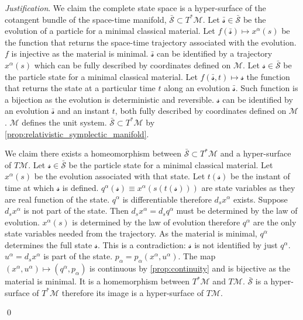 \documentclass[aps,pra,10pt,twocolumn,floatfix,nofootinbib]{revtex4-1}
\numberwithin{equation}{section}
\theoremstyle{definition}
\newenvironment{justification}{\emph{Justification}.}{\qed}
\begin{document}
\begin{justification}
	We claim the complete state space is a hyper-surface of the cotangent bundle of the space-time manifold, $\bar{\mathcal{S}} \subset T^*\mathcal{M}$. Let $\bar{\mathcal{s}} \in \bar{\mathcal{S}}$ be the evolution of a particle for a minimal classical material. Let $f(\bar{\mathcal{s}}) \mapsto x^\alpha(s)$ be the function that returns the space-time trajectory associated with the evolution. $f$ is injective as the material is minimal. $\bar{\mathcal{s}}$ can be identified by a trajectory $x^\alpha(s)$ which can be fully described by coordinates defined on $\mathcal{M}$. Let $\mathcal{s} \in \bar{\mathcal{S}}$ be the particle state for a minimal classical material. Let $f(\bar{\mathcal{s}}, t) \mapsto \mathcal{s}$ the function that returns the state at a particular time $t$ along an evolution $\bar{\mathcal{s}}$. Such function is a bijection as the evolution is deterministic and reversible. $\mathcal{s}$ can be identified by an evolution $\bar{\mathcal{s}}$ and an instant $t$, both fully described by coordinates defined on $\mathcal{M}$. $\mathcal{M}$ defines the unit system. $\bar{\mathcal{S}} \subset T^*\mathcal{M}$ by \ref{prop:relativistic_symplectic_manifold}.
	
	We claim there exists a homeomorphism between $\bar{\mathcal{S}} \subset T^*\mathcal{M}$ and a hyper-surface of $T\mathcal{M}$. Let $\mathcal{s} \in \bar{\mathcal{S}}$ be the particle state for a minimal classical material. Let $x^\alpha(s)$ be the evolution associated with that state. Let $t(\mathcal{s})$ be the instant of time at which $\mathcal{s}$ is defined. $q^\alpha(\mathcal{s}) \equiv x^\alpha(s(t(\mathcal{s})))$ are state variables as they are real function of the state. $q^\alpha$ is differentiable therefore $d_s x^\alpha$ exists. Suppose $d_s x^\alpha$ is not part of the state. Then $d_s x^\alpha = d_s q^\alpha$ must be determined by the law of evolution. $x^\alpha(s)$ is determined by the law of evolution therefore $q^\alpha$ are the only state variables needed from the trajectory. As the material is minimal, $q^\alpha$ determines the full state $\mathcal{s}$. This is a contradiction: $\mathcal{s}$ is not identified by just $q^\alpha$. $u^\alpha=d_s x^\alpha$ is part of the state. $p_\alpha = p_\alpha(x^\alpha, u^\alpha)$. The map $(x^\alpha, u^\alpha) \mapsto (q^\alpha, p_\alpha)$ is continuous by \ref{prop:continuity} and is bijective as the material is minimal. It is a homemorphism between $T^*\mathcal{M}$ and $T\mathcal{M}$. $\bar{\mathcal{S}}$ is a hyper-surface of $T^*\mathcal{M}$ therefore its image is a hyper-surface of $T\mathcal{M}$.
	

\end{justification}
\end{document}
